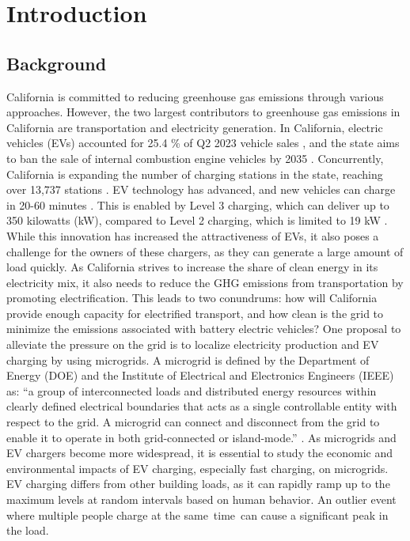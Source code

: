 \documentclass[conference]{IEEEtran}
\begin{document}
\section{Introduction}
    \subsection{Background}
		California is committed to reducing greenhouse gas emissions through various approaches. However, the two largest contributors to greenhouse gas emissions in California are transportation and electricity generation.  In California, electric vehicles (EVs) accounted for 25.4 \% of Q2 2023 vehicle sales \cite{ev_sale_percentage}, and the state aims to ban the sale of internal combustion engine vehicles by 2035 \cite{ice_ban}. Concurrently, California is expanding the number of charging stations in the state, reaching over 13,737 stations \cite{ev_stations_CA}. EV technology has advanced, and new vehicles can charge in 20-60 minutes \cite{ev_stats}. This is enabled by Level 3 charging, which can deliver up to 350 kilowatts (kW), compared to Level 2 charging, which is limited to 19 kW \cite{ev_stats}. While this innovation has increased the attractiveness of EVs, it also poses a challenge for the owners of these chargers, as they can generate a large amount of load quickly. As California strives to increase the share of clean energy in its electricity mix, it also needs to reduce the GHG emissions from transportation by promoting electrification. This leads to two conundrums: how will California provide enough capacity for electrified transport, and how clean is the grid to minimize the emissions associated with battery electric vehicles? One proposal to alleviate the pressure on the grid is to localize electricity production and EV charging by using microgrids. A microgrid is defined by the Department of Energy (DOE) and the Institute of Electrical and Electronics Engineers (IEEE) as: “a group of interconnected loads and distributed energy resources within clearly defined electrical boundaries that acts as a single controllable entity with respect to the grid. A microgrid can connect and disconnect from the grid to enable it to operate in both grid-connected or island-mode.” \cite{microgrid_def} \cite{microgrid_def_ieee}. As microgrids and EV chargers become more widespread, it is essential to study the economic and environmental impacts of EV charging, especially fast charging, on microgrids. EV charging differs from other building loads, as it can rapidly ramp up to the maximum levels at random intervals based on human behavior. An outlier event where multiple people charge at the same time can cause a significant peak in the load. \\
		
\end{document}
